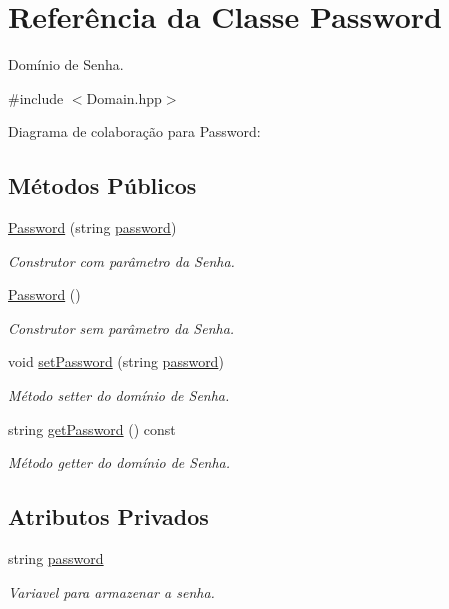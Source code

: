 \hypertarget{classPassword}{}\section{Referência da Classe Password}
\label{classPassword}


Domínio de Senha.  




{\ttfamily \#include $<$Domain.\+hpp$>$}



Diagrama de colaboração para Password\+:
\subsection*{Métodos Públicos}
\begin{DoxyCompactItemize}
\item 
\hyperlink{classPassword_a2882019457d5f399cacce381b6c30762}{Password} (string \hyperlink{classPassword_ac9fc114f63a9435c29530413b303564e}{password})
\begin{DoxyCompactList}\small\item\em Construtor com parâmetro da Senha. \end{DoxyCompactList}\item 
\hyperlink{classPassword_a9ed0401599b14d501a8f46779048cdf2}{Password} ()
\begin{DoxyCompactList}\small\item\em Construtor sem parâmetro da Senha. \end{DoxyCompactList}\item 
void \hyperlink{classPassword_a1e4ef90d6b6609d0c416ee32369eb31a}{set\+Password} (string \hyperlink{classPassword_ac9fc114f63a9435c29530413b303564e}{password})
\begin{DoxyCompactList}\small\item\em Método setter do domínio de Senha. \end{DoxyCompactList}\item 
string \hyperlink{classPassword_aa1ab24038569d57185a45e9f85737739}{get\+Password} () const 
\begin{DoxyCompactList}\small\item\em Método getter do domínio de Senha. \end{DoxyCompactList}\end{DoxyCompactItemize}
\subsection*{Atributos Privados}
\begin{DoxyCompactItemize}
\item 
string \hyperlink{classPassword_ac9fc114f63a9435c29530413b303564e}{password}\hypertarget{classPassword_ac9fc114f63a9435c29530413b303564e}{}\label{classPassword_ac9fc114f63a9435c29530413b303564e}

\begin{DoxyCompactList}\small\item\em Variavel para armazenar a senha. \end{DoxyCompactList}\end{DoxyCompactItemize}


